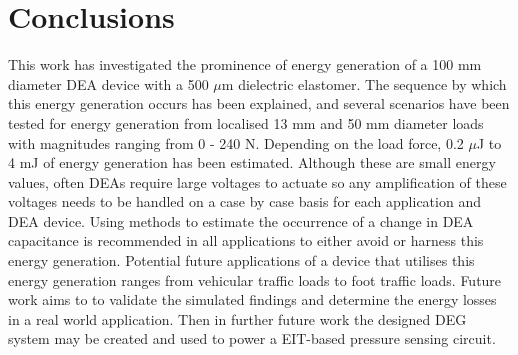 
\section{Conclusions}

This work has investigated the prominence of energy generation of a 100 mm diameter DEA device with a 500 $\mu$m dielectric elastomer. The sequence by which this energy generation occurs has been explained, and several scenarios have been tested for energy generation from localised 13 mm and 50 mm diameter loads with magnitudes ranging from 0 - 240 N. Depending on the load force, 0.2 $\mu$J to 4 mJ of energy generation has been estimated. Although these are small energy values, often DEAs require large voltages to actuate so any amplification of these voltages needs to be handled on a case by case basis for each application and DEA device. Using methods to estimate the occurrence of a change in DEA capacitance is recommended in all applications to either avoid or harness this energy generation. Potential future applications of a device that utilises this energy generation ranges from vehicular traffic loads to foot traffic loads. Future work aims to to validate the simulated findings and determine the energy losses in a real world application. Then in further future work the designed DEG system may be created and used to power a EIT-based pressure sensing circuit. 

